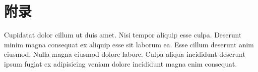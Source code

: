 \section*{附录}

Cupidatat dolor cillum ut duis amet. Nisi tempor aliquip esse culpa.
Deserunt minim magna consequat ex aliquip esse sit laborum ea. Esse cillum
deserunt anim eiusmod. Nulla magna eiusmod dolore labore. Culpa aliqua
incididunt deserunt ipsum fugiat ex adipisicing veniam dolore incididunt
magna enim consequat.

\newpage
